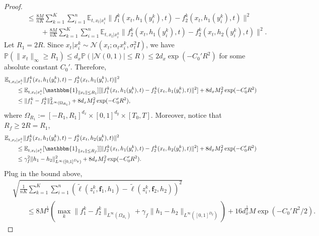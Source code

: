 \documentclass{article}
\numberwithin{equation}{section}
\def\vf{{\bm{f}}}
\newcommand{\E}{\mathbb{E}}
\theoremstyle{definition}
\renewcommand{\P}{\mathbb{P}}
\begin{document}
\begin{proof}
\begin{equation}
\begin{aligned}
            &\qquad\leq \frac{8M}{nK}\sum_{k=1}^K\sum_{i=1}^n \E_{t,x_t|x_i^k}\|f_1^k(x_t,h_1(y_i^k),t)-f_2^k(x_t,h_1(y_i^k),t)\|^2 \\
            &\qquad\qquad + \frac{8M}{nK}\sum_{k=1}^K\sum_{i=1}^n \E_{t,x_t|x_i^k}\|f_2^k(x_t,h_1(y_i^k),t)-f_2^k(x_t,h_2(y_i^k),t)\|^2.
        \end{aligned}
    \end{equation}
    Let $R_1=2R$. Since $x_t|x_i^k\sim\mathcal{N}(x_t;\alpha_tx_i^k,\sigma_t^2I)$, we have $\P(\|x_t\|_\infty\geq R_1)\leq d_x\P(|\mathcal{N}(0,1)|\leq R)\leq 2d_x\exp(-C_0'R^2)$ for some absolute constant $C_0'$.
    Therefore,
    \begin{equation}
        \begin{aligned}
            &\E_{t,x_t|x_i^k}\|f_1^k(x_t,h_1(y_i^k),t)-f_2^k(x_t,h_1(y_i^k),t)\|^2 \\
            &\qquad \leq \E_{t,x_t|x_i^k}[\mathbbm{1}_{\|x_t\|\leq R_1}] [\|f_1^k(x_t,h_1(y_i^k),t)-f_2^k(x_t,h_1(y_i^k),t)\|^2] + 8d_xM_f^2\exp(-C_0'R^2) \\
            &\qquad \leq \|f_1^k-f_2^k\|^2_{L^\infty(\Omega_{R_1})} + 8d_xM_f^2\exp(-C_0'R^2),
        \end{aligned}
    \end{equation}
    where $\Omega_{R_1}:=[-R_1,R_1]^{d_x}\times[0,1]^{d_y}\times[T_0,T]$. 
    Moreover, notice that $R_f\geq 2R=R_1$,
    \begin{equation}
        \begin{aligned}
            &\E_{t,x_t|x_i^k}\|f_2^k(x_t,h_1(y_i^k),t)-f_2^k(x_t,h_2(y_i^k),t)\|^2 \\
            &\qquad \leq \E_{t,x_t|x_i^k}[\mathbbm{1}_{\|x_t\|\leq R_f}] [\|f_2^k(x_t,h_1(y_i^k),t)-f_2^k(x_t,h_2(y_i^k),t)\|^2] + 8d_xM_f^2\exp(-C_0'R^2) \\
            &\qquad \leq \gamma_f^2\|h_1-h_2\|^2_{L^\infty([0,1]^{D_y})} + 8d_xM_f^2\exp(-C_0'R^2).
        \end{aligned}
    \end{equation}
    Plug in the bound above,
    \begin{equation}
        \begin{aligned}
            &\sqrt{\frac{1}{nK}\sum_{k=1}^K\sum_{i=1}^n(\widetilde{\ell}(z_i^k,\vf_1,h_1)-\widetilde{\ell}(z_i^k,\vf_2,h_2))^2} \\
            &\qquad \leq 8M^{\frac{1}{2}}\left(\max_k\|f_1^k-f_2^k\|_{L^\infty(\Omega_{R_1})}+\gamma_f\|h_1-h_2\|_{L^\infty([0,1]^{D_y})}\right) + 16d_x^{\frac{1}{2}}M\exp(-C_0'R^2/2).

\end{aligned}
\end{equation}
\end{proof}
\end{document}
